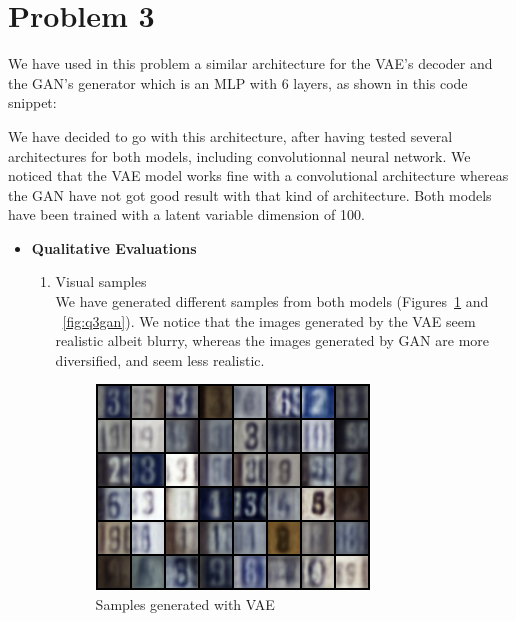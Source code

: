 \section*{Problem 3}
We have used in this problem a similar architecture for the VAE's decoder and the GAN's generator which is an MLP with 6 layers, as shown in this code snippet:


We have decided to go with this architecture, after having tested several architectures for both models, including convolutionnal neural network. We noticed that the VAE model works fine with a convolutional architecture whereas the GAN have not got good result with that kind of architecture. Both models have been trained with a latent variable dimension of 100.

\begin{itemize}
\item[A.] {\textbf{Qualitative Evaluations}}\\
\begin{enumerate}
	\item[1.]{Visual samples}\\
	We have generated different samples from both models (Figures~\ref{fig:q3vae} and ~\ref{fig:q3gan}). We notice that the images generated by the VAE seem realistic albeit blurry, whereas the images generated by GAN are more diversified, and seem less realistic. 
	\begin{figure}[H]
		\centering
		\includegraphics[scale=1]{Q3vaesample.png}
		\caption{Samples generated with VAE}
		\label{fig:q3vae}
	\end{figure}
	

\end{enumerate}
\end{itemize}
